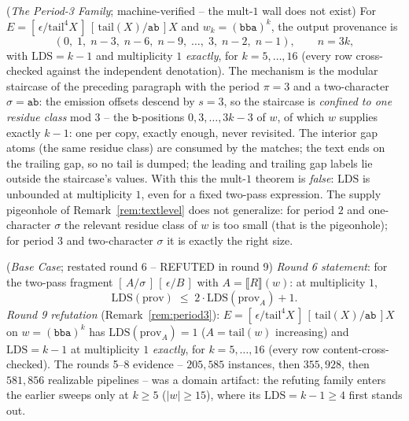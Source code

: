 \begin{remark}
    (\emph{The Period-3 Family}; machine-verified -- the mult-$1$
    wall does not exist)
    \label{rem:period3}
    For $E = [\,\epsilon/\mathrm{tail}^4 X\,]\,[\,\mathrm{tail}(X)/
    \mathtt{ab}\,]X$ and $w_k = (\mathtt{bba})^{k}$, the output
    provenance is
    \[
        (0,\; 1,\; n-3,\; n-6,\; n-9,\; \ldots,\; 3,\; n-2,\; n-1),
        \qquad n = 3k,
    \]
    with $\mathrm{LDS} = k - 1$ and multiplicity $1$ \emph{exactly},
    for $k = 5, \ldots, 16$ (every row cross-checked against the
    independent denotation).  The mechanism is the modular staircase
    of the preceding paragraph with the period $\pi = 3$ and a
    two-character $\sigma = \mathtt{ab}$: the emission offsets descend
    by $s = 3$, so the staircase is \emph{confined to one residue
    class} mod $3$ -- the $\mathtt{b}$-positions $0, 3, \ldots, 3k-3$
    of $w$, of which $w$ supplies exactly $k-1$: one per copy,
    exactly enough, never revisited.  The interior gap atoms (the
    same residue class) are consumed by the matches; the text ends on
    the trailing gap, so no tail is dumped; the leading and trailing
    gap labels lie outside the staircase's values.  With this the
    mult-$1$ theorem is \emph{false}: $\mathrm{LDS}$ is unbounded at
    multiplicity $1$, even for a fixed two-pass expression.  The
    supply pigeonhole of Remark~\ref{rem:textlevel} does not
    generalize: for period $2$ and one-character $\sigma$ the
    relevant residue class of $w$ is too small (that is the
    pigeonhole); for period $3$ and two-character $\sigma$ it is
    exactly the right size.
\end{remark}


\begin{conjecture}
    (\emph{Base Case}; restated round 6 -- REFUTED in round 9)
    \label{prop:basecase}
    \emph{Round 6 statement}: for the two-pass fragment
    $[\,A/\sigma\,]\,[\,\epsilon/B\,]$ with $A =
    \llbracket R \rrbracket(w)$: at multiplicity $1$,
    \[
        \mathrm{LDS}(\mathrm{prov}) \;\leq\; 2 \cdot
        \mathrm{LDS}(\mathrm{prov}_A) + 1 .
    \]
    \emph{Round 9 refutation} (Remark~\ref{rem:period3}): $E =
    [\,\epsilon/\mathrm{tail}^4 X\,]\,[\,\mathrm{tail}(X)/
    \mathtt{ab}\,]X$ on $w = (\mathtt{bba})^{k}$ has
    $\mathrm{LDS}(\mathrm{prov}_A) = 1$ ($A = \mathrm{tail}(w)$
    increasing) and $\mathrm{LDS} = k - 1$ at multiplicity $1$
    \emph{exactly}, for $k = 5, \ldots, 16$ (every row
    content-cross-checked).  The rounds 5--8 evidence -- $205{,}585$
    instances, then $355{,}928$, then $581{,}856$ realizable
    pipelines -- was a domain artifact: the refuting family enters
    the earlier sweeps only at $k \geq 5$ ($|w| \geq 15$), where its
    $\mathrm{LDS} = k - 1 \geq 4$ first stands out.
\end{conjecture}

